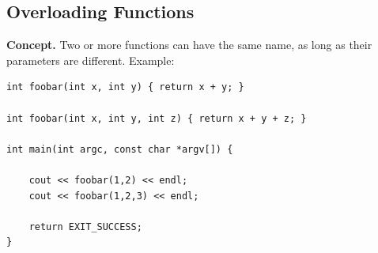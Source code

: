 \documentclass{report}
\begin{document}
    \subsection{Overloading Functions}
    \bigbreak \noindent 
    \textbf{Concept.} Two or more functions can have the same name, as long as their parameters are different.
    \bigbreak \noindent 
    Example:
    \bigbreak \noindent 
    \sepline
    \begin{verbatim}
int foobar(int x, int y) { return x + y; }

int foobar(int x, int y, int z) { return x + y + z; }

int main(int argc, const char *argv[]) {

    cout << foobar(1,2) << endl;
    cout << foobar(1,2,3) << endl;

    return EXIT_SUCCESS;
}
    \end{verbatim}
    \sepline
    


    





    





    
\end{document}
